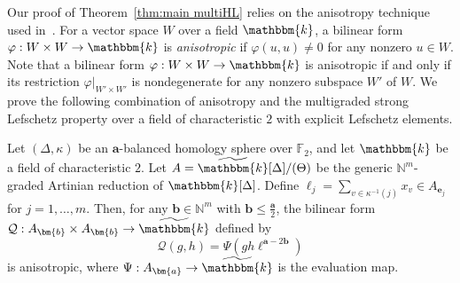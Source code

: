 Our proof of Theorem~\ref{thm:main multiHL} relies on the anisotropy technique used in~\cite{APP,APPS,KX,PP}.
For a vector space $W$ over a field $\mathbbm{k}$, a bilinear form $\varphi:W \times W \rightarrow \mathbbm{k}$ is \emph{anisotropic} if $\varphi(u,u) \neq 0$ for any nonzero $u \in W$.
Note that a bilinear form $\varphi:W \times W \rightarrow \mathbbm{k}$ is anisotropic if and only if its restriction $\varphi|_{W' \times W'}$ is nondegenerate for any nonzero subspace $W'$ of $W$.
We prove the following combination of anisotropy and the multigraded strong Lefschetz property over a field of characteristic $2$ with explicit Lefschetz elements.
\begin{theorem} \label{thm:main anis}
Let $(\Delta,\kappa)$ be an $\bm{a}$-balanced homology sphere over $\mathbb{F}_2$, and let $\mathbbm{k}$ be a field of characteristic $2$. 
Let $A=\widetilde{\mathbbm{k}}[\Delta]/(\Theta)$ be the generic $\mathbb{N}^m$-graded Artinian reduction of $\mathbbm{k}[\Delta]$.
Define $\ell_j=\sum_{v \in \kappa^{-1}(j)} x_v \in A_{\bm{e}_j}$ for $j=1,\ldots,m$.
Then, for any $\bm{b} \in \mathbb{N}^m$ with $\bm{b} \leq \frac{\bm{a}}{2}$, the bilinear form $\mathcal{Q}:A_{\bm{b}}\times A_{\bm{b}} \rightarrow \widetilde{\mathbbm{k}}$ defined by
\[
\mathcal{Q}(g,h)=\Psi(gh \bm{\ell}^{\bm{a}-2\bm{b}})
\]
is anisotropic, where $\Psi:A_{\bm{a}} \rightarrow \widetilde{\mathbbm{k}}$ is the evaluation map.
\end{theorem}

